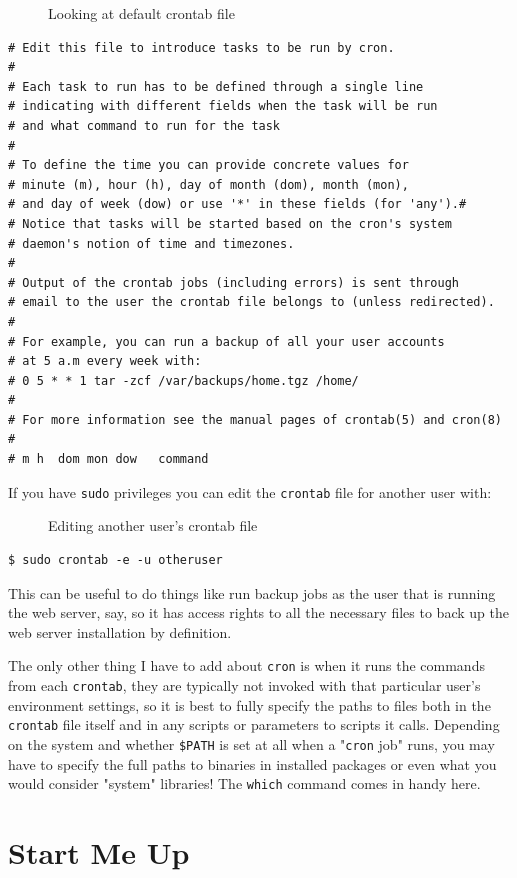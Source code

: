 \documentclass[10pt,]{book}
\numberwithin{figure}{chapter}
\DeclareRobustCommand{\drcap}[1]{\begin{figure}[H]\caption{#1}\end{figure}}
\DeclareRobustCommand{\drenv}[1]{\index{Environment Variables!#1}}
\begin{document}
\drcap{Looking at default crontab file}

\begin{verbatim}
# Edit this file to introduce tasks to be run by cron.
#
# Each task to run has to be defined through a single line
# indicating with different fields when the task will be run
# and what command to run for the task
#
# To define the time you can provide concrete values for
# minute (m), hour (h), day of month (dom), month (mon),
# and day of week (dow) or use '*' in these fields (for 'any').#
# Notice that tasks will be started based on the cron's system
# daemon's notion of time and timezones.
#
# Output of the crontab jobs (including errors) is sent through
# email to the user the crontab file belongs to (unless redirected).
#
# For example, you can run a backup of all your user accounts
# at 5 a.m every week with:
# 0 5 * * 1 tar -zcf /var/backups/home.tgz /home/
#
# For more information see the manual pages of crontab(5) and cron(8)
#
# m h  dom mon dow   command
\end{verbatim}

If you have \texttt{sudo} privileges you can edit the \texttt{crontab}
file for another user with:

\drcap{Editing another user's crontab file}

\begin{verbatim}
$ sudo crontab -e -u otheruser
\end{verbatim}

This can be useful to do things like run backup jobs as the user that is
running the web server, say, so it has access rights to all the
necessary files to back up the web server installation by definition.

The only other thing I have to add about \texttt{cron} is when it runs
the commands from each \texttt{crontab}, they are typically not invoked
with that particular user's environment settings, so it is best to fully
specify the paths to files both in the \texttt{crontab} file itself and
in any scripts or parameters to scripts it calls. Depending on the
system and whether \texttt{\$PATH}\drenv{PATH} is set at all when a
"\texttt{cron} job" runs, you may have to specify the full paths to
binaries in installed packages or even what you would consider "system"
libraries! The \texttt{which} command comes in handy here.

\section*{Start Me Up}\label{start-me-up}
\end{document}
